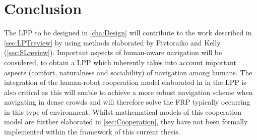 \section{Conclusion} \label{sec:ConclusionReview}
The LPP to be designed in \cref{cha:Design} will contribute to the work described in \cref{sec:LPTreview} by using methods elaborated by Pivtoraiko and Kelly (\cref{sec:SLreview}). Important aspects of human-aware navigation will be considered, to obtain a LPP which inherently takes into account important aspects (comfort, naturalness and sociability) of navigation among humans. The integration of the human-robot cooperation model elaborated in \cite{TrautmanEtAl2015} in the LPP is also critical as this will enable to achieve a more robust navigation scheme when navigating in dense crowds and will therefore solve the FRP typically occurring in this type of environment. Whilst mathematical models of this cooperation model are further elaborated in \cref{sec:Cooperation}, they have not been formally implemented within the framework of this current thesis.